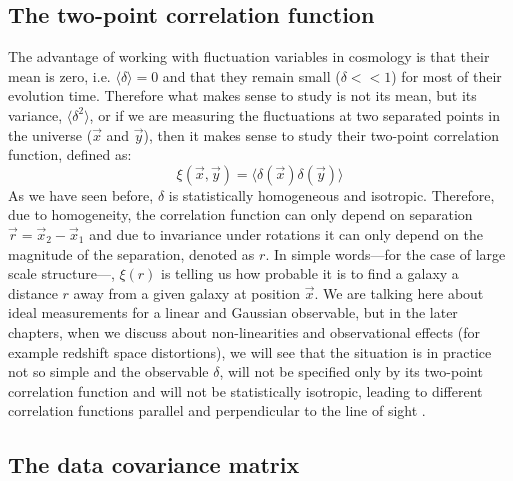 \subsection{The two-point correlation function}

The advantage of working with fluctuation variables in cosmology is that their mean is zero, i.e. $\langle \delta \rangle = 0$ 
and that they remain small ($\delta<<1$) for most of their evolution time.
Therefore what makes sense to study  is not its mean, but its variance, $\langle \delta^2 \rangle$, or if 
we are measuring the fluctuations at two separated points in the universe ($\vec{x}$ and $\vec{y}$),
then it makes sense to study their two-point correlation function, defined as:
\begin{equation} \label{eq:correlationfunct}
\xi(\vec{x} ,\vec{y}) = \langle \delta (\vec{x})  \delta (\vec{y}) \rangle
\end{equation}
As we have seen before, $\delta$ is statistically homogeneous and isotropic. Therefore, due to homogeneity, the correlation
function can only depend on separation $\vec r = \vec{x}_2 - \vec{x}_1 $  and due to invariance under 
rotations it can only depend on the magnitude of the separation, denoted as $r$.
In simple words---for the case of large scale structure---, $\xi(r)$ is telling us how probable it is to find
a galaxy a distance $r$ away from a given galaxy at position $\vec x$.
We are talking here about  ideal measurements for a linear and Gaussian observable, but in the later chapters, when we discuss
about non-linearities and observational effects (for example redshift space distortions), we will see that the situation is in practice not so simple and 
the observable $\delta$, will not be specified only by its 
two-point correlation function and will not be statistically isotropic, leading to different correlation
functions parallel and perpendicular to the line of sight \cite{(cite some BAO stuff)}.

\subsection{The data covariance matrix}

